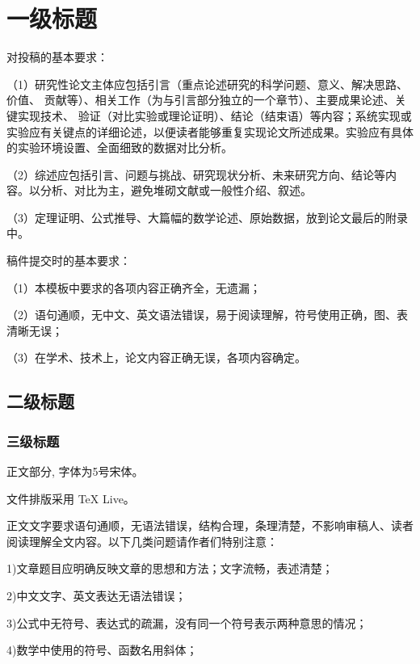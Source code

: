 \documentclass{cjc}
\begin{document}
\maketitle


\section{一级标题}

对投稿的基本要求：

（1）研究性论文主体应包括引言（重点论述研究的科学问题、意义、解决思路、价值、
贡献等）、相关工作（为与引言部分独立的一个章节）、主要成果论述、关键实现技术、
验证（对比实验或理论证明）、结论（结束语）等内容；系统实现或实验应有关键点的详细论述，以便读者能够重复实现论文所述成果。实验应有具体的实验环境设置、全面细致的数据对比分析。

（2）综述应包括引言、问题与挑战、研究现状分析、未来研究方向、结论等内容。以分析、对比为主，避免堆砌文献或一般性介绍、叙述。

（3）定理证明、公式推导、大篇幅的数学论述、原始数据，放到论文最后的附录中。

稿件提交时的基本要求：

（1）本模板中要求的各项内容正确齐全，无遗漏；

（2）语句通顺，无中文、英文语法错误，易于阅读理解，符号使用正确，图、表清晰无误；

（3）在学术、技术上，论文内容正确无误，各项内容确定。

\subsection{二级标题}

\subsubsection{三级标题}

正文部分, 字体为5号宋体。

文件排版采用 TeX Live。

正文文字要求语句通顺，无语法错误，结构合理，条理清楚，不影响审稿人、读者阅读理解全文内容。以下几类问题请作者们特别注意：

1)文章题目应明确反映文章的思想和方法；文字流畅，表述清楚；

2)中文文字、英文表达无语法错误；

3)公式中无符号、表达式的疏漏，没有同一个符号表示两种意思的情况；

4)数学中使用的符号、函数名用斜体；
\end{document}
